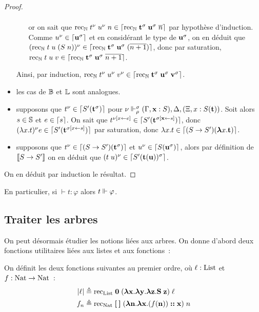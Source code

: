 \documentclass{article}
\begin{document}
\begin{proof}
\begin{itemize}
\begin{itemize}
\begin{align*}
      \end{align*}
      or on sait que $\mathrm{rec}_{\mathbb{N}}\;t^\nu\;u^\nu\;n\in\lceil \mathrm{rec}_{\mathbb{N}}\;\mathbf{t}^\sigma\;\mathbf{u}^\sigma\;\overline n \rceil$ par hypothèse d'induction. Comme $u^\nu \in \lceil \mathbf{u}^\sigma \rceil$ et en considérant le type de $\mathbf{u}^\sigma$, on en déduit que $(\mathrm{rec}_{\mathbb{N}}\;t\;u\;(S\;n))^\nu \in \lceil \mathrm{rec}_{\mathbb{N}}\;\mathbf{t}^\sigma\;\mathbf{u}^\sigma\;(\overline{n+1}) \rceil$, donc par saturation, $\mathrm{rec}_{\mathbb{N}}\;t\;u\;v\in\lceil \mathrm{rec}_{\mathbb{N}}\;\mathbf{t}^\sigma\;\mathbf{u}^\sigma\;\overline{n+1} \rceil$.
    \end{itemize}
    Ainsi, par induction, $\mathrm{rec}_{\mathbb{N}}\;t^\nu\;u^\nu\;v^\nu \in \lceil \mathrm{rec}_{\mathbb{N}}\;\mathbf{t}^\sigma\;\mathbf{u}^\sigma\;\mathbf{v}^\sigma \rceil$.
  \item les cas de $\mathbb{B}$ et $\mathbb{L}$ sont analogues.
  \item supposons que $t^\nu\in\lceil S'(\mathbf{t}^\sigma) \rceil$ pour $\nu\Vdash_\rho^\sigma (\Gamma, \mathbf{x} : S), \Delta,(\Xi, x : S(\mathbf{t}))$. Soit alors $s\in\mathbb{S}$ et $e\in \lceil s \rceil$. On sait que $t^{\nu[x\leftarrow e]}\in\lceil S'(\mathbf{t}^{\sigma[\mathbf{x}\leftarrow s]}) \rceil$, donc $(\lambda x.t)^\nu e \in \lceil S'(\mathbf{t}^{\sigma[x\leftarrow s]}) \rceil$ par saturation, donc $\lambda x.t\in\lceil (S\to S')(\boldsymbol{\lambda} x.\mathbf{t}) \rceil$.
  \item supposons que $t^\nu \in\lceil (S\to S')(\mathbf{t}^\sigma) \rceil$ et $u^\nu \in\lceil S(\mathbf{u}^\sigma) \rceil$, alors par définition de $\llbracket S\to S' \rrbracket$ on en déduit que $(t\;u)^\nu\in\lceil S'(\mathbf{t}(\mathbf{u}))^\sigma \rceil$.
  \end{itemize}

  On en déduit par induction le résultat.
\end{proof}

En particulier, si $\vdash t : \varphi$ alors $t\Vdash \varphi$.

\subsection{Traiter les arbres}

On peut désormais étudier les notions liées aux arbres. On donne d'abord deux fonctions utilitaires liées aux listes et aux fonctions~:

\begin{defi}
  On définit les deux fonctions suivantes au premier ordre, où $\ell : \mathrm{List}$ et $f : \mathrm{Nat}\to\mathrm{Nat}$~:
  \begin{align*}
    |\ell| &\triangleq \mathrm{rec}_{\mathrm{List}}\;\boldsymbol 0\;(\boldsymbol{\lambda} \mathbf{x}.\boldsymbol{\lambda}\mathbf{y}.\boldsymbol{\lambda}\mathbf{z}.\mathbf{S}\;\mathbf{z})\;\ell\\
    f_n &\triangleq \mathrm{rec}_{\mathrm{Nat}}\;\boldsymbol{ [ }\:\boldsymbol{ ] }\;(\boldsymbol{\lambda} \mathbf{n}.\boldsymbol{\lambda} \mathbf{x}.(f(\mathbf{n}))\boldsymbol{:}\boldsymbol{:} \mathbf{x})\;n
  \end{align*}
\end{defi}
\end{document}
